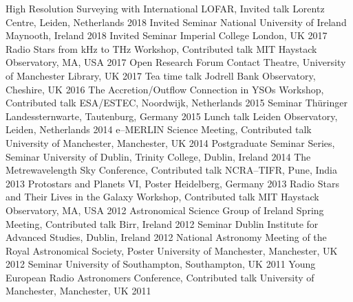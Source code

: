 \begin{cvpress}
   \cvpres
    {High Resolution Surveying with International LOFAR, Invited talk}
    {Lorentz Centre, Leiden, Netherlands}
    {2018}
   \cvpres
    {Invited Seminar}
    {National University of Ireland Maynooth, Ireland}
    {2018}
   \cvpres
    {Invited Seminar}
    {Imperial College London, UK}
    {2017}
   \cvpres
    {Radio Stars from kHz to THz Workshop, Contributed talk}
    {MIT Haystack Observatory, MA, USA}
    {2017}
   \cvpres
    {Open Research Forum}
    {Contact Theatre, University of Manchester Library, UK}
    {2017}
  \cvpres
  {Tea time talk}
  {Jodrell Bank Observatory, Cheshire, UK}
  {2016}
  \cvpres
    {The Accretion/Outflow Connection in YSOs Workshop, Contributed talk}
    {ESA/ESTEC, Noordwijk, Netherlands}
    {2015}
  \cvpres
    {Seminar}
    {Th{\"u}ringer Landessternwarte, Tautenburg, Germany}
    {2015}
  \cvpres
    {Lunch talk}
    {Leiden Observatory, Leiden, Netherlands}
    {2014}
  \cvpres
    {e--MERLIN Science Meeting, Contributed talk}
    {University of Manchester, Manchester, UK}
    {2014}
  \cvpres
    {Postgraduate Seminar Series, Seminar}
    {University of Dublin, Trinity College, Dublin, Ireland}
    {2014}
   \cvpres
   	{The Metrewavelength Sky Conference, Contributed talk}
    {NCRA--TIFR, Pune, India}
    {2013}
   \cvpres
   	{Protostars and Planets VI, Poster}
    {Heidelberg, Germany}
    {2013}
   \cvpres
   	{Radio Stars and Their Lives in the Galaxy Workshop, Contributed talk}
    {MIT Haystack Observatory, MA, USA}
    {2012}
   \cvpres
   	{Astronomical Science Group of Ireland Spring Meeting, Contributed talk}
    {Birr, Ireland}
    {2012}
   \cvpres
   	{Seminar}
    {Dublin Institute for Advanced Studies, Dublin, Ireland}
    {2012}
   \cvpres
   	{National Astronomy Meeting of the Royal Astronomical Society, Poster}
    {University of Manchester, Manchester, UK}
    {2012}
   \cvpres
   	{Seminar}
    {University of Southampton, Southampton, UK}
    {2011}
   \cvpres
   	{Young European Radio Astronomers Conference, Contributed talk}
    {University of Manchester, Manchester, UK}
    {2011}
\end{cvpress}


